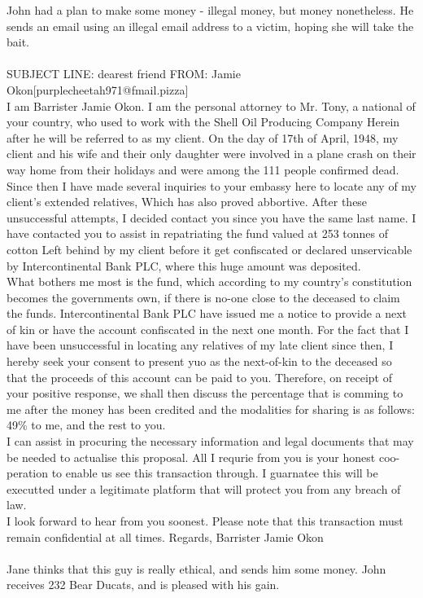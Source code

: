 \documentclass{article}
\begin{document}
John had a plan to make some money {-} illegal money, but money nonetheless.
He sends an email using an illegal email address to a victim, hoping she will take the bait.
\\\\
SUBJECT LINE: dearest friend
FROM: Jamie Okon[purplecheetah971@fmail.pizza]
\\
I am Barrister Jamie Okon.
I am the personal attorney to Mr. Tony, a national of your country, who used to work with the Shell Oil Producing Company
Herein after he will be referred to as my client.
On the day of 17th of April, 1948, my client and his wife and their only daughter were involved in a plane crash on their way home from their holidays and were among the 111 people confirmed dead.
\\
Since then I have made several inquiries to your embassy here to locate any of my client's extended relatives, Which has also proved abbortive.
After these unsuccessful attempts, I decided contact you since you have the same last name.
I have contacted you to assist in repatriating the fund valued at 253 tonnes of cotton Left behind by my client before it get confiscated or declared unservicable by Intercontinental Bank PLC, where this huge amount was deposited.
\\
What bothers me most is the fund, which according to my country's constitution becomes the governments own, if there is no{-}one close to the deceased to claim the funds.
Intercontinental Bank PLC have issued me a notice to provide a next of kin or have the account confiscated in the next one month.
For the fact that I have been unsuccessful in locating any relatives of my late client since then, I hereby seek your consent to present yuo as the next{-}of{-}kin to the deceased so that the proceeds of this account can be paid to you.
Therefore, on receipt of your positive response, we shall then discuss the percentage that is comming to me after the money has been credited and the modalities for sharing is as follows: 49\% to me, and the rest to you.
\\
I can assist in procuring the necessary information and legal documents that may be needed to actualise this proposal.
All I requrie from you is your honest coo{-}peration to enable us see this transaction through.
I guarnatee this will be executted under a legitimate platform that will protect you from any breach of law.
\\
I look forward to hear from you soonest.
Please note that this transaction must remain confidential at all times.
Regards, Barrister Jamie Okon
\\\\
Jane thinks that this guy is really ethical, and sends him some money.
John receives 232 Bear Ducats, and is pleased with his gain.
\end{document}
